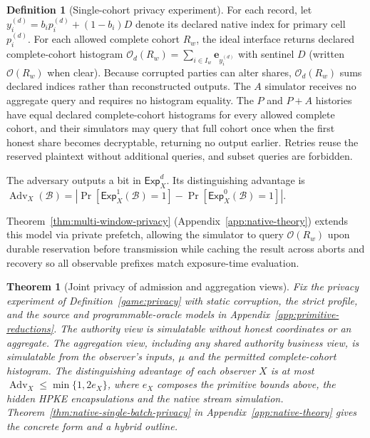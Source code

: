 \documentclass[conference,compsoc]{IEEEtran}
\theoremstyle{definition}
\newtheorem{definition}{Definition}[section]
\newtheorem{definition}{Definition}
\numberwithin{equation}{section}
\numberwithin{table}{section}
\numberwithin{figure}{section}
\theoremstyle{plain}
\newtheorem{theorem}{Theorem}[section]
\newtheorem{theorem}{Theorem}
\begin{document}
\begin{definition}[Single-cohort privacy experiment]
For each record, let \(y_i^{(d)}=b_i p_i^{(d)}+(1-b_i)D\) denote its declared native index for primary cell \(p_i^{(d)}\). For each allowed complete cohort \(R_w\), the ideal interface returns declared complete-cohort histogram \(\mathcal O_d(R_w)=\sum_{i\in I_w}\mathbf e_{y_i^{(d)}}\) with sentinel \(D\) (written \(\mathcal O(R_w)\) when clear). Because corrupted parties can alter shares, \(\mathcal O_d(R_w)\) sums declared indices rather than reconstructed outputs. The \(A\) simulator receives no aggregate query and requires no histogram equality. The \(P\) and \(P{+}A\) histories have equal declared complete-cohort histograms for every allowed complete cohort, and their simulators may query that full cohort once when the first honest share becomes decryptable, returning no output earlier. Retries reuse the reserved plaintext without additional queries, and subset queries are forbidden.

The adversary outputs a bit in \(\mathsf{Exp}_X^d\). Its distinguishing
advantage is \(\operatorname{Adv}_X(\mathcal B)=
|\Pr[\mathsf{Exp}_X^1(\mathcal B)=1]-
\Pr[\mathsf{Exp}_X^0(\mathcal B)=1]|\).
\end{definition}

Theorem~\ref{thm:multi-window-privacy} (Appendix~\ref{app:native-theory}) extends this model via private prefetch, allowing the simulator to query \(\mathcal O(R_w)\) upon durable reservation before transmission while caching the result across aborts and recovery so all observable prefixes match exposure-time evaluation.

\begin{theorem}[Joint privacy of admission and aggregation views]
\label{thm:joint-privacy-main}
Fix the privacy experiment of Definition~\ref{game:privacy} with static corruption,
the strict profile, and the source and programmable-oracle models in
Appendix~\ref{app:primitive-reductions}. The authority view is simulatable without honest coordinates or an aggregate.
The aggregation view, including any shared authority business view, is simulatable
from the observer's inputs, \(\mu\) and the permitted complete-cohort histogram. The distinguishing advantage of each observer \(X\) is at most
\(\operatorname{Adv}_X\le\min\{1,2e_X\}\), where \(e_X\) composes the
primitive bounds above, the hidden HPKE encapsulations and the native
stream simulation. Theorem~\ref{thm:native-single-batch-privacy} in Appendix~\ref{app:native-theory} gives the
concrete form and a hybrid outline.
\end{theorem}
\end{document}
